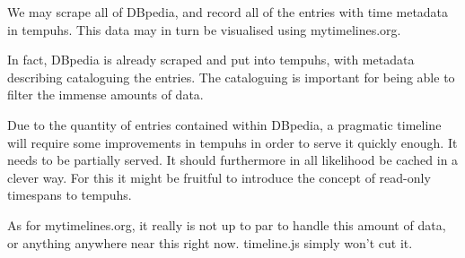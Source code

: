 We may scrape all of DBpedia, and record all of the entries with time metadata 
in tempuhs. This data may in turn be visualised using mytimelines.org.

In fact, DBpedia is already scraped and put into tempuhs, with metadata 
describing cataloguing the entries. The cataloguing is important for being 
able to filter the immense amounts of data.

Due to the quantity of entries contained within DBpedia, a pragmatic timeline 
will require some improvements in tempuhs in order to serve it quickly enough. 
It needs to be partially served. It should furthermore in all likelihood be 
cached in a clever way. For this it might be fruitful to introduce the concept 
of read-only timespans to tempuhs.

As for mytimelines.org, it really is not up to par to handle this amount of 
data, or anything anywhere near this right now. timeline.js simply won't cut 
it.
